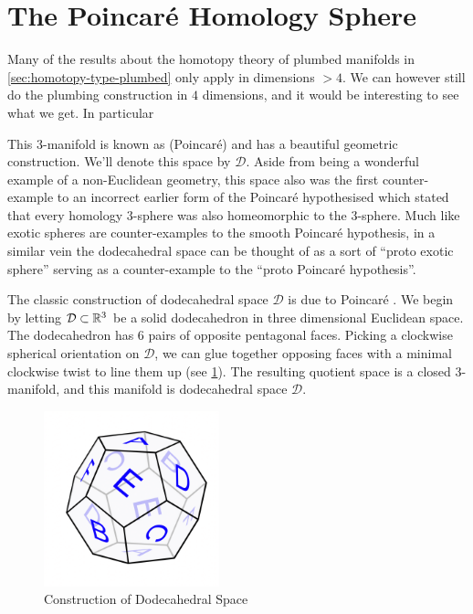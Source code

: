 \section{The Poincar\'e Homology Sphere}

Many of the results about the homotopy theory of plumbed manifolds in \cref{sec:homotopy-type-plumbed} only apply in dimensions $>4$. We can however still do the plumbing construction in $4$ dimensions, and it would be interesting to see what we get. In particular 


This $3$-manifold is known as (Poincar\'e)  and has a beautiful geometric construction. We'll denote this space by $\mathscr{D}$. Aside from being a wonderful example of a non-Euclidean geometry, this space also was the first counter-example to an incorrect earlier form of the Poincar\'e hypothesised which stated that every homology $3$-sphere was also homeomorphic to the $3$-sphere. Much like exotic spheres are counter-examples to the smooth Poincar\'e hypothesis, in a similar vein the dodecahedral space can be thought of as a sort of ``proto exotic sphere'' serving as a counter-example to the ``proto Poincar\'e hypothesis''.

The classic construction of dodecahedral space $\mathscr{D}$ is due to Poincar\'e . We begin by letting $\mathcal{D}\subset \mathbb{R}^3$ be a solid dodecahedron in three dimensional Euclidean space. The dodecahedron has 6 pairs of opposite pentagonal faces. Picking a clockwise spherical orientation on $\mathcal{D}$, we can glue together opposing faces with a minimal clockwise twist to line them up (see \cref{fig:dodecahedral_space_construction}). The resulting quotient space is a closed $3$-manifold, and this manifold is dodecahedral space $\mathscr{D}$.

\begin{figure}[ht]
	\centering
	\includegraphics[width=2in]{graphics/temp-diagrams/dodecahedral-space-geometric-construction.png}
	\caption{Construction of Dodecahedral Space}\label{fig:dodecahedral_space_construction}
\end{figure}

